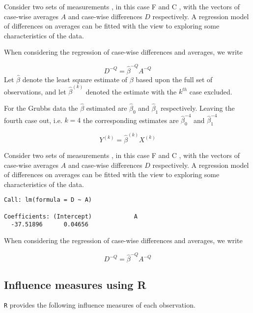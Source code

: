 \documentclass[12pt, a4paper]{report}
\theoremstyle{plain}
\theoremstyle{definition}
\theoremstyle{remark}
\begin{document}
Consider two sets of measurements , in this case F and C , with
the vectors of case-wise averages $A$ and case-wise differences
$D$ respectively. A regression model of differences on averages
can be fitted with the view to exploring some characteristics of
the data.





When considering the regression of case-wise differences and
averages, we write

\begin{equation}
D^{-Q} = \hat{\beta}^{-Q}A^{-Q}
\end{equation}
Let $\hat{\beta}$ denote the least square estimate of $\beta$
based upon the full set of observations, and let $\hat{\beta}^{(k)}$ denoted the estimate with the $k^{th}$ case
excluded.

For the Grubbs data the $\hat{\beta}$ estimated are $\hat{\beta}_{0}$ and $\hat{\beta}_{1}$ respectively. Leaving the
fourth case out, i.e. $k=4$ the corresponding estimates are $\hat{\beta}_{0}^{-4}$ and $\hat{\beta}_{1}^{-4}$

\begin{equation}
Y^{(k)} = \hat{\beta}^{(k)}X^{(k)}
\end{equation}

Consider two sets of measurements , in this case F and C , with the vectors of case-wise averages $A$ and case-wise differences $D$ respectively. A regression model of differences on averages can be fitted with the view to exploring some characteristics of the data.

\begin{verbatim}
Call: lm(formula = D ~ A)

Coefficients: (Intercept)            A
  -37.51896      0.04656

\end{verbatim}




When considering the regression of case-wise differences and averages, we write

\begin{equation}
D^{-Q} = \hat{\beta}^{-Q}A^{-Q}
\end{equation}



\subsection{Influence measures using R}
\texttt{R} provides the following influence measures of each observation.
\end{document}
